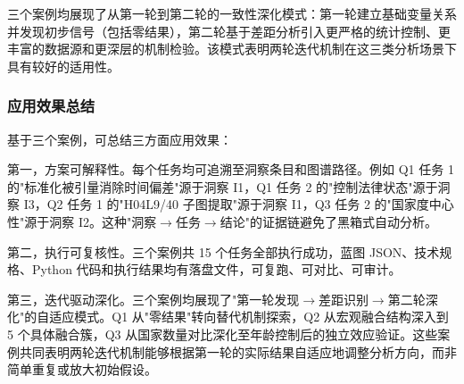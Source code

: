 
\begin{table}[htbp]
\centering
\caption{两轮迭代效果对比}
\label{tab:iteration-comparison}
\end{table}

三个案例均展现了从第一轮到第二轮的一致性深化模式：第一轮建立基础变量关系并发现初步信号（包括零结果），第二轮基于差距分析引入更严格的统计控制、更丰富的数据源和更深层的机制检验。该模式表明两轮迭代机制在这三类分析场景下具有较好的适用性。

\subsubsection{应用效果总结}

基于三个案例，可总结三方面应用效果：

第一，方案可解释性。每个任务均可追溯至洞察条目和图谱路径。例如 Q1 任务 1 的"标准化被引量消除时间偏差"源于洞察 I1，Q1 任务 2 的"控制法律状态"源于洞察 I3，Q2 任务 1 的"H04L9/40 子图提取"源于洞察 I1，Q3 任务 2 的"国家度中心性"源于洞察 I2。这种"洞察$\rightarrow$任务$\rightarrow$结论"的证据链避免了黑箱式自动分析。

第二，执行可复核性。三个案例共 15 个任务全部执行成功，蓝图 JSON、技术规格、Python 代码和执行结果均有落盘文件，可复跑、可对比、可审计。

第三，迭代驱动深化。三个案例均展现了"第一轮发现$\rightarrow$差距识别$\rightarrow$第二轮深化"的自适应模式。Q1 从"零结果"转向替代机制探索，Q2 从宏观融合结构深入到 5 个具体融合簇，Q3 从国家数量对比深化至年龄控制后的独立效应验证。这些案例共同表明两轮迭代机制能够根据第一轮的实际结果自适应地调整分析方向，而非简单重复或放大初始假设。

